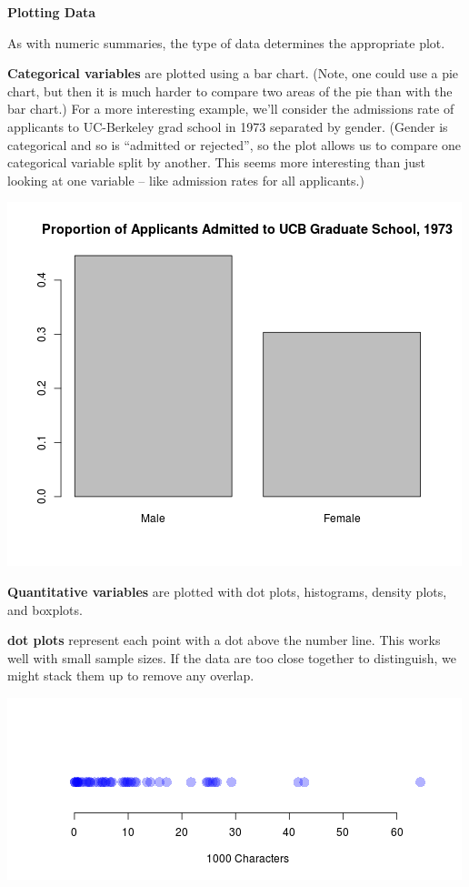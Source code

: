 \begin{center}
{\bf {\large  Plotting Data}}
\end{center}

 As with numeric summaries, the type of data determines the
 appropriate plot. \vspace{-.5cm}
\begin{list}{}{}
\item [\bf Categorical variables] are plotted using a bar
  chart. (Note, one could use a pie chart, but then it is much harder
  to compare two areas of the pie than with the bar chart.)
  For a more interesting example, we'll consider the admissions rate
  of applicants  to UC-Berkeley grad school in 1973 separated by
  gender. (Gender is categorical and so is ``admitted or  rejected'',
  so the plot allows us to compare one categorical variable split by
  another. This seems more interesting than just looking at one
  variable -- like admission rates for all applicants.)

  \begin{center}
  \includegraphics[width = .45\linewidth]{plots/UCBadmissions.png}
  \end{center}
  
\item [\bf Quantitative variables] are plotted with dot plots, histograms,
  density plots, and boxplots.

  \begin{list}{}{}
  \item [\bf dot plots] represent each point with a dot above the number
    line. This works well with small sample sizes.  If the data are
    too close together to distinguish, we might stack them up to
    remove any overlap. \vspace{-1cm}

  \begin{center}
  \includegraphics[width = .8\linewidth]{plots/dotplotDemo1.png}
  \end{center}


\end{list}
\end{list}

